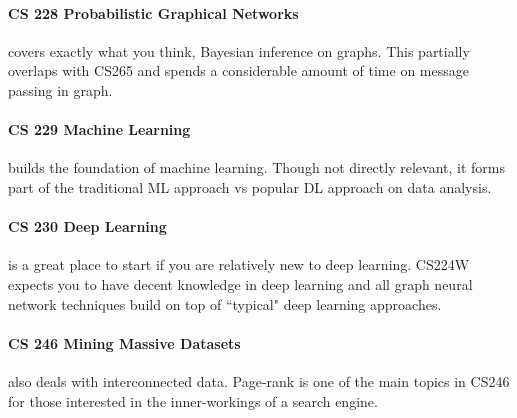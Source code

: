 \paragraph{CS 228 Probabilistic Graphical Networks} covers exactly what you think, Bayesian inference on graphs. This partially overlaps with CS265 and spends a considerable amount of time on message passing in graph. 

\paragraph{CS 229 Machine Learning} builds the foundation of machine learning. Though not directly relevant, it forms part of the traditional ML approach vs popular DL approach on data analysis.

\paragraph{CS 230 Deep Learning} is a great place to start if you are relatively new to deep learning. CS224W expects you to have decent knowledge in deep learning and all graph neural network techniques build on top of ``typical" deep learning approaches.

\paragraph{CS 246 Mining Massive Datasets} also deals with interconnected data. Page-rank is one of the main topics in CS246 for those interested in the inner-workings of a search engine.
